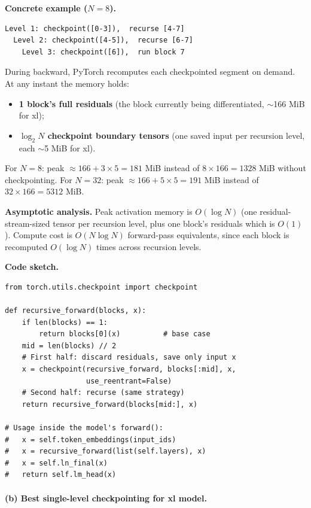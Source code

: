 \documentclass[11pt]{article}
\begin{document}
\medskip\noindent\textbf{Concrete example ($N = 8$).}
\begin{verbatim}
Level 1: checkpoint([0-3]),  recurse [4-7]
  Level 2: checkpoint([4-5]),  recurse [6-7]
    Level 3: checkpoint([6]),  run block 7
\end{verbatim}
During backward, PyTorch recomputes each checkpointed segment on
demand.  At any instant the memory holds:
\begin{itemize}
  \item \textbf{1 block's full residuals} (the block currently being
    differentiated, $\sim$166 MiB for xl);
  \item \textbf{$\log_2 N$ checkpoint boundary tensors} (one saved
    input per recursion level, each $\sim$5 MiB for xl).
\end{itemize}
For $N = 8$: peak $\approx 166 + 3 \times 5 = 181$ MiB instead of
$8 \times 166 = 1328$ MiB without checkpointing.
For $N = 32$: peak $\approx 166 + 5 \times 5 = 191$ MiB instead of
$32 \times 166 = 5312$ MiB.

\medskip\noindent\textbf{Asymptotic analysis.}
Peak activation memory is $O(\log N)$ (one residual-stream-sized tensor
per recursion level, plus one block's residuals which is $O(1)$).
Compute cost is $O(N \log N)$ forward-pass equivalents, since each
block is recomputed $O(\log N)$ times across recursion levels.

\medskip\noindent\textbf{Code sketch.}
\begin{verbatim}
from torch.utils.checkpoint import checkpoint

def recursive_forward(blocks, x):
    if len(blocks) == 1:
        return blocks[0](x)          # base case
    mid = len(blocks) // 2
    # First half: discard residuals, save only input x
    x = checkpoint(recursive_forward, blocks[:mid], x,
                   use_reentrant=False)
    # Second half: recurse (same strategy)
    return recursive_forward(blocks[mid:], x)

# Usage inside the model's forward():
#   x = self.token_embeddings(input_ids)
#   x = recursive_forward(list(self.layers), x)
#   x = self.ln_final(x)
#   return self.lm_head(x)
\end{verbatim}

\paragraph{(b) Best single-level checkpointing for xl model.}
\end{document}
